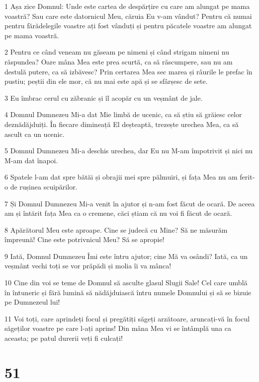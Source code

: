 \par 1 Așa zice Domnul: Unde este cartea de despărțire cu care am alungat pe mama voastră? Sau care este datornicul Meu, căruia Eu v-am vândut? Pentru că numai pentru fărădelegile voastre ați fost vânduți și pentru păcatele voastre am alungat pe mama voastră.
\par 2 Pentru ce când veneam nu găseam pe nimeni și când strigam nimeni nu răspundea? Oare mâna Mea este prea scurtă, ca să răscumpere, sau nu am destulă putere, ca să izbăvesc? Prin certarea Mea sec marea și râurile le prefac în pustiu; peștii din ele mor, că nu mai este apă și se sfârșesc de sete.
\par 3 Eu îmbrac cerul cu zăbranic și îl acopăr cu un veșmânt de jale.
\par 4 Domnul Dumnezeu Mi-a dat Mie limbă de ucenic, ca să știu să grăiesc celor deznădăjduiți. În fiecare dimineață El deșteaptă, trezește urechea Mea, ca să ascult ca un ucenic.
\par 5 Domnul Dumnezeu Mi-a deschis urechea, dar Eu nu M-am împotrivit și nici nu M-am dat înapoi.
\par 6 Spatele l-am dat spre bătăi și obrajii mei spre pălmuiri, și fața Mea nu am ferit-o de rușinea scuipărilor.
\par 7 Și Domnul Dumnezeu Mi-a venit în ajutor și n-am fost făcut de ocară. De aceea am și întărit fața Mea ca o cremene, căci știam că nu voi fi făcut de ocară.
\par 8 Apărătorul Meu este aproape. Cine se judecă cu Mine? Să ne măsurăm împreună! Cine este potrivnicul Meu? Să se apropie!
\par 9 Iată, Domnul Dumnezeu Îmi este întru ajutor; cine Mă va osândi? Iată, ca un veșmânt vechi toți se vor prăpădi și molia îi va mânca!
\par 10 Cine din voi se teme de Domnul să asculte glasul Slugii Sale! Cel care umblă în întuneric și fără lumină să nădăjduiască întru numele Domnului și să se bizuie pe Dumnezeul lui!
\par 11 Voi toți, care aprindeți focul și pregătiți săgeți arzătoare, aruncați-vă în focul săgeților voastre pe care l-ați aprins! Din mâna Mea vi se întâmplă una ca aceasta; pe patul durerii veți fi culcați!

\chapter{51}

